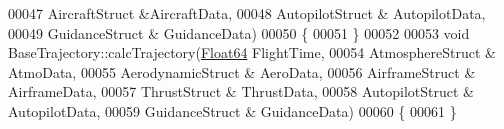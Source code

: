 \begin{DoxyCode}
00047                                         AircraftStruct &AircraftData, 
00048                                         AutopilotStruct & AutopilotData,
00049                                         GuidanceStruct & GuidanceData)
00050 \{
00051 \}
00052 
00053 \textcolor{keywordtype}{void} BaseTrajectory::calcTrajectory(\hyperlink{group___tools_ga3f1431cb9f76da10f59246d1d743dc2c}{Float64} FlightTime, 
00054                                     AtmosphereStruct & AtmoData, 
00055                                     AerodynamicStruct & AeroData, 
00056                                     AirframeStruct & AirframeData, 
00057                                     ThrustStruct & ThrustData, 
00058                                     AutopilotStruct & AutopilotData, 
00059                                     GuidanceStruct & GuidanceData)
00060 \{
00061 \}
\end{DoxyCode}

